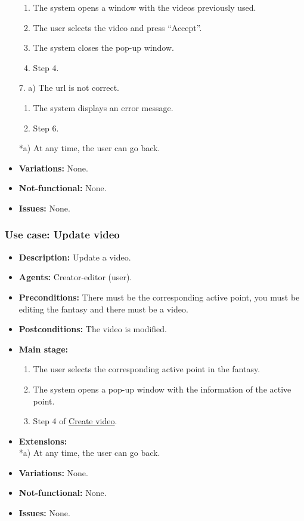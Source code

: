 \begin{itemize}
\begin{enumerate}
		\item The system opens a window with the videos previously used.
		\item The user selects the video and press ``Accept''.
		\item The system closes the pop-up window.
		\item Step 4.
	\end{enumerate}
	7. a) The url is not correct.
	\begin{enumerate}
		\item The system displays an error message.
		\item Step 6.
	\end{enumerate}
	*a) At any time, the user can go back.
	\item \textbf{Variations:} None.
	\item \textbf{Not-functional:} None.
	\item \textbf{Issues:} None.
\end{itemize}

\subsubsection{Use case: Update video}
\begin{itemize}
	\item \textbf{Description:} Update a video.
	\item \textbf{Agents:} Creator-editor (user).
	\item \textbf{Preconditions:} There must be the corresponding active point, you must be editing the fantasy and there must be a video.
	\item \textbf{Postconditions:} The video is modified.
	\item \textbf{Main stage:}
	\begin{enumerate}
		\item The user selects the corresponding active point in the fantasy.
		\item The system opens a pop-up window with the information of the active point.
		\item Step 4 of \hyperlink{crearvideo}{Create video}.
	\end{enumerate}
	\item \textbf{Extensions:} \\ *a) At any time, the user can go back.
	\item \textbf{Variations:} None.
	\item \textbf{Not-functional:} None.
	\item \textbf{Issues:} None.
\end{itemize}

